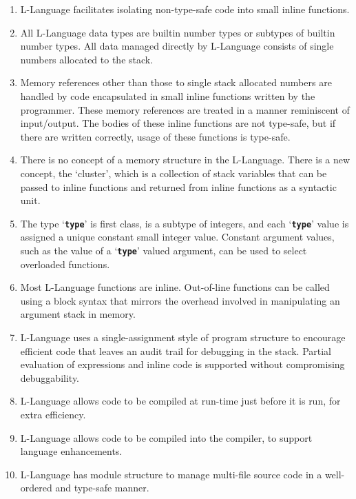 \documentclass[12pt]{article}
\newcommand{\TT}[1]{{\tt \bfseries #1}}
\begin{document}
\begin{enumerate}

\item
L-Language facilitates isolating non-type-safe code into small inline functions.

\item
All L-Language data types are builtin number types or subtypes of
builtin number types.  All data managed directly by L-Language consists
of single numbers allocated to the stack.

\item
Memory references other than those to single stack allocated numbers
are handled by code
encapsulated in small inline functions written by the programmer.
These memory references
are treated in a manner reminiscent of input/output.
The bodies of these inline functions are not type-safe, but if
there are written correctly, usage of these functions is type-safe.

\item
There is no concept of a memory structure in the L-Language.  There
is a new concept, the `cluster', which is a collection of stack
variables that can be passed to inline functions
and returned from inline functions as a syntactic unit.

\item
The type `\TT{type}' is first class, is a subtype of integers, and
each `\TT{type}' value is assigned
a unique constant small integer value.  Constant
argument values, such as the value of a `\TT{type}' valued
argument, can be used to select overloaded functions.

\item
Most L-Language functions are inline.  Out-of-line functions can be
called using a block syntax that mirrors the overhead involved in
manipulating an argument stack in memory.

\item
L-Language uses a single-assignment style of program structure
to encourage
efficient code that leaves an audit trail for debugging in the stack.
Partial evaluation of expressions and inline code is supported without
compromising debuggability.

\item
L-Language allows code to be compiled at run-time just before
it is run, for extra efficiency.

\item
L-Language allows code to be compiled into the compiler, to support
language enhancements.

\item
L-Language has module structure to manage
multi-file source code in a well-ordered and type-safe manner.


\end{enumerate}
\end{document}
